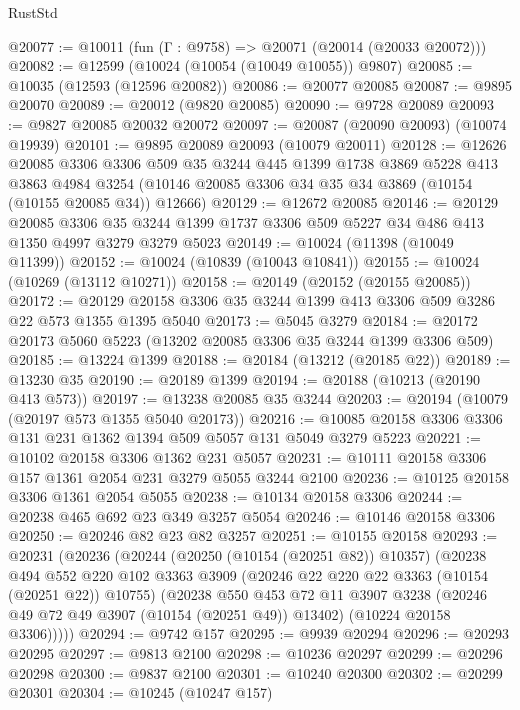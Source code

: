 \begin{lexlean}{RustStd}
\begin{coremodule}
@20077 := @10011 (fun (Γ : @9758) => @20071 (@20014 (@20033 @20072)))
@20082 := @12599 (@10024 (@10054 (@10049 @10055)) @9807)
@20085 := @10035 (@12593 (@12596 @20082))
@20086 := @20077 @20085
@20087 := @9895 @20070
@20089 := @20012 (@9820 @20085)
@20090 := @9728 @20089
@20093 := @9827 @20085 @20032 @20072
@20097 := @20087 (@20090 @20093) (@10074 @19939)
@20101 := @9895 @20089 @20093 (@10079 @20011)
@20128 := @12626
    @20085
    @3306
    @3306
    @509
    @35
    @3244
    @445
    @1399
    @1738
    @3869
    @5228
    @413
    @3863
    @4984
    @3254
    (@10146 @20085 @3306 @34 @35 @34 @3869 (@10154 (@10155 @20085 @34)) @12666)
@20129 := @12672 @20085
@20146 := @20129
    @20085
    @3306
    @35
    @3244
    @1399
    @1737
    @3306
    @509
    @5227
    @34
    @486
    @413
    @1350
    @4997
    @3279
    @3279
    @5023
@20149 := @10024 (@11398 (@10049 @11399))
@20152 := @10024 (@10839 (@10043 @10841))
@20155 := @10024 (@10269 (@13112 @10271))
@20158 := @20149 (@20152 (@20155 @20085))
@20172 := @20129 @20158 @3306 @35 @3244 @1399 @413 @3306 @509 @3286 @22 @573 @1355 @1395 @5040
@20173 := @5045 @3279
@20184 := @20172 @20173 @5060 @5223 (@13202 @20085 @3306 @35 @3244 @1399 @3306 @509)
@20185 := @13224 @1399
@20188 := @20184 (@13212 (@20185 @22))
@20189 := @13230 @35
@20190 := @20189 @1399
@20194 := @20188 (@10213 (@20190 @413 @573))
@20197 := @13238 @20085 @35 @3244
@20203 := @20194 (@10079 (@20197 @573 @1355 @5040 @20173))
@20216 := @10085 @20158 @3306 @3306 @131 @231 @1362 @1394 @509 @5057 @131 @5049 @3279 @5223
@20221 := @10102 @20158 @3306 @1362 @231 @5057
@20231 := @10111 @20158 @3306 @157 @1361 @2054 @231 @3279 @5055 @3244 @2100
@20236 := @10125 @20158 @3306 @1361 @2054 @5055
@20238 := @10134 @20158 @3306
@20244 := @20238 @465 @692 @23 @349 @3257 @5054
@20246 := @10146 @20158 @3306
@20250 := @20246 @82 @23 @82 @3257
@20251 := @10155 @20158
@20293 := @20231
    (@20236
      (@20244
        (@20250 (@10154 (@20251 @82)) @10357)
        (@20238
          @494
          @552
          @220
          @102
          @3363
          @3909
          (@20246 @22 @220 @22 @3363 (@10154 (@20251 @22)) @10755)
          (@20238
            @550
            @453
            @72
            @11
            @3907
            @3238
            (@20246 @49 @72 @49 @3907 (@10154 (@20251 @49)) @13402)
            (@10224 @20158 @3306)))))
@20294 := @9742 @157
@20295 := @9939 @20294
@20296 := @20293 @20295
@20297 := @9813 @2100
@20298 := @10236 @20297
@20299 := @20296 @20298
@20300 := @9837 @2100
@20301 := @10240 @20300
@20302 := @20299 @20301
@20304 := @10245 (@10247 @157)

\end{coremodule}
\end{lexlean}
